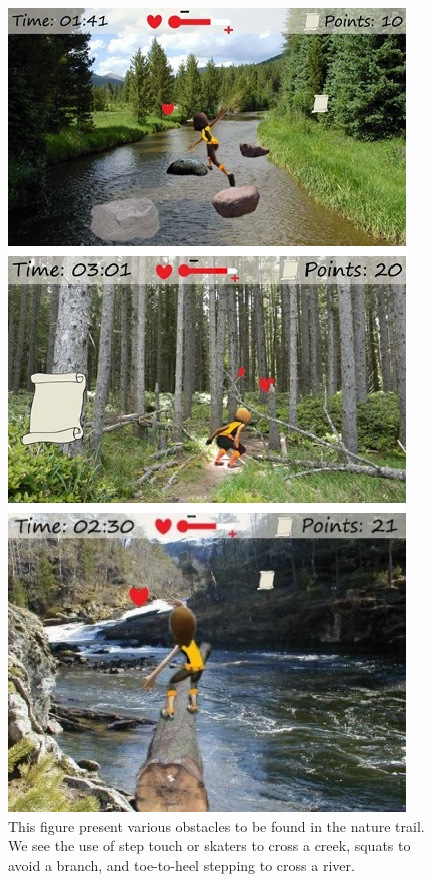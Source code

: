 \begin{figure} [H]
\centering
\includegraphics[scale=0.65]{hindringer1Eng.jpg}
\caption[Nature trail - obstacles, part one]{This figure present various obstacles to be found in the nature trail. We see the use of step touch or skaters to cross a creek, squats to avoid a branch, and toe-to-heel stepping to cross a river.}
\label{fig:hindring1}
\end{figure}

